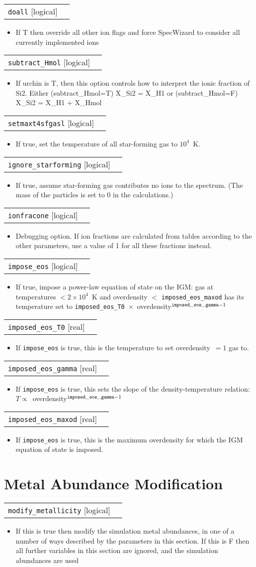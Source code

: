 \documentclass{report}
\makeatletter
\newcommand{\paramdefinition}[3]{
\begin{tabular*}{\textwidth}{l@{\extracolsep{\fill}}r}
		{\tt #1} [{\sc #2}]& #3 \\
\end{tabular*}}
\newcommand{\paramdescription}[1]{
\begin{itemize}
\item #1
\end{itemize}\vspace{0.2cm}}
\newcommand{\param}[1]{{\tt #1}}
\makeatother
\begin{document}
\paramdefinition{doall}{logical}{}
\paramdescription{If T then override all other ion flags and force SpecWizard to consider all currently implemented ions}

\paramdefinition{subtract\_Hmol}{logical}{}
\paramdescription{If urchin is T, then this option controls how to interpret the ionic fraction of Si2. Either (subtract\_Hmol=T) X\_Si2 = X\_H1 or (subtract\_Hmol=F) X\_Si2 = X\_H1 + X\_Hmol}

\paramdefinition{setmaxt4sfgasl}{logical}{}
\paramdescription{If true, set the temperature of all star-forming gas to $10^{4}$~K.}

\paramdefinition{ignore\_starforming}{logical}{}
\paramdescription{If true, assume star-forming gas contributes no ions to the spectrum. (The mass of the particles is set to 0 in the calculations.)}

\paramdefinition{ionfracone}{logical}{}
\paramdescription{Debugging option. If ion fractions are calculated from tables according to the other parameters, use a value of 1 for all these fractions instead.}

\paramdefinition{impose\_eos}{logical}{}
\paramdescription{If true, impose a power-law equation of state on the IGM: gas at temperatures $< 2 \times 10^{4}$~K and overdensity $<$ \param{imposed\_eos\_maxod} has its temperature set to \param{imposed\_eos\_T0}~$\times$~overdensity$^{\param{imposed\_eos\_gamma}-1}$}

\paramdefinition{imposed\_eos\_T0}{real}{}
\paramdescription{If \param{impose\_eos} is true, this is the temperature to set overdensity~$=1$ gas to.}

\paramdefinition{imposed\_eos\_gamma}{real}{}
\paramdescription{If \param{impose\_eos} is true, this sets the slope of the density-temperature relation: $T \propto $~overdensity$^{\param{imposed\_eos\_gamma} - 1}$}

\paramdefinition{imposed\_eos\_maxod}{real}{}
\paramdescription{If \param{impose\_eos} is true, this is the maximum overdensity for which the IGM equation of state is imposed.}



\section{Metal Abundance Modification}

\paramdefinition{modify\_metallicity}{logical}{ }
\paramdescription{If this is true then modify the simulation metal abundances, in one of a number of ways described by the parameters in this section.  If this is F then all further variables in this section are ignored, and the simulation abundances are used}
\end{document}
